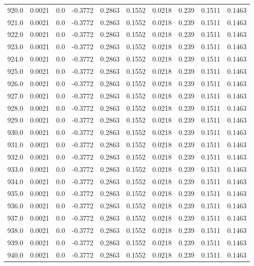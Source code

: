 \begin{longtable}{lrrrrrrrrr}
920.0 & 0.0021 & 0.0 & -0.3772 & 0.2863 & 0.1552 & 0.0218 & 0.239 & 0.1511 & 0.1463 \\
921.0 & 0.0021 & 0.0 & -0.3772 & 0.2863 & 0.1552 & 0.0218 & 0.239 & 0.1511 & 0.1463 \\
922.0 & 0.0021 & 0.0 & -0.3772 & 0.2863 & 0.1552 & 0.0218 & 0.239 & 0.1511 & 0.1463 \\
923.0 & 0.0021 & 0.0 & -0.3772 & 0.2863 & 0.1552 & 0.0218 & 0.239 & 0.1511 & 0.1463 \\
924.0 & 0.0021 & 0.0 & -0.3772 & 0.2863 & 0.1552 & 0.0218 & 0.239 & 0.1511 & 0.1463 \\
925.0 & 0.0021 & 0.0 & -0.3772 & 0.2863 & 0.1552 & 0.0218 & 0.239 & 0.1511 & 0.1463 \\
926.0 & 0.0021 & 0.0 & -0.3772 & 0.2863 & 0.1552 & 0.0218 & 0.239 & 0.1511 & 0.1463 \\
927.0 & 0.0021 & 0.0 & -0.3772 & 0.2863 & 0.1552 & 0.0218 & 0.239 & 0.1511 & 0.1463 \\
928.0 & 0.0021 & 0.0 & -0.3772 & 0.2863 & 0.1552 & 0.0218 & 0.239 & 0.1511 & 0.1463 \\
929.0 & 0.0021 & 0.0 & -0.3772 & 0.2863 & 0.1552 & 0.0218 & 0.239 & 0.1511 & 0.1463 \\
930.0 & 0.0021 & 0.0 & -0.3772 & 0.2863 & 0.1552 & 0.0218 & 0.239 & 0.1511 & 0.1463 \\
931.0 & 0.0021 & 0.0 & -0.3772 & 0.2863 & 0.1552 & 0.0218 & 0.239 & 0.1511 & 0.1463 \\
932.0 & 0.0021 & 0.0 & -0.3772 & 0.2863 & 0.1552 & 0.0218 & 0.239 & 0.1511 & 0.1463 \\
933.0 & 0.0021 & 0.0 & -0.3772 & 0.2863 & 0.1552 & 0.0218 & 0.239 & 0.1511 & 0.1463 \\
934.0 & 0.0021 & 0.0 & -0.3772 & 0.2863 & 0.1552 & 0.0218 & 0.239 & 0.1511 & 0.1463 \\
935.0 & 0.0021 & 0.0 & -0.3772 & 0.2863 & 0.1552 & 0.0218 & 0.239 & 0.1511 & 0.1463 \\
936.0 & 0.0021 & 0.0 & -0.3772 & 0.2863 & 0.1552 & 0.0218 & 0.239 & 0.1511 & 0.1463 \\
937.0 & 0.0021 & 0.0 & -0.3772 & 0.2863 & 0.1552 & 0.0218 & 0.239 & 0.1511 & 0.1463 \\
938.0 & 0.0021 & 0.0 & -0.3772 & 0.2863 & 0.1552 & 0.0218 & 0.239 & 0.1511 & 0.1463 \\
939.0 & 0.0021 & 0.0 & -0.3772 & 0.2863 & 0.1552 & 0.0218 & 0.239 & 0.1511 & 0.1463 \\
940.0 & 0.0021 & 0.0 & -0.3772 & 0.2863 & 0.1552 & 0.0218 & 0.239 & 0.1511 & 0.1463 \\

\end{longtable}
